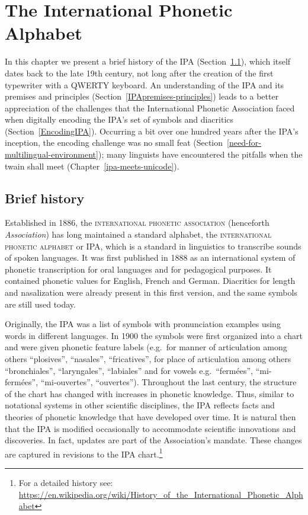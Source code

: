 \chapter{The International Phonetic Alphabet}
\label{the-international-phonetic-alphabet}

In this chapter we present a brief history of the IPA 
(Section~\ref{IPAhistory}), which itself dates 
back to the late 19th century, not long after the creation of the first 
typewriter with a QWERTY 
keyboard. An understanding of the IPA and its premises and principles 
(Section~\ref{IPApremises-principles}) leads to a better 
appreciation of the challenges that the International Phonetic Association 
faced when digitally encoding the IPA's set of symbols and 
diacritics (Section~\ref{EncodingIPA}). Occurring a bit over one hundred 
years after the IPA's inception, the encoding challenge was no small feat 
(Section~\ref{need-for-multilingual-environment}); many 
linguists have encountered the pitfalls when the twain shall meet 
(Chapter~\ref{ipa-meets-unicode}).

\section{Brief history}
\label{IPAhistory}

Established in 1886, the \textsc{international phonetic association} (henceforth
\textit{Association}) has long maintained a standard alphabet, the
\textsc{international phonetic alphabet} or IPA, which is a
standard in linguistics to transcribe sounds of spoken languages. It was
first published in 1888 as an international system of phonetic transcription for
oral languages and for pedagogical purposes. It contained phonetic values for
English, French and German. Diacritics for length and nasalization were already
present in this first version, and the same symbols are still used today. 

Originally, the IPA was a list of symbols with pronunciation examples
using words in different languages. In 1900 the symbols were first organized into
a chart and were given phonetic feature labels (e.g.\ for manner of
articulation among others ``plosives'', ``nasales'', ``fricatives'', for place of
articulation among others ``bronchiales'', ``laryngales'', ``labiales'' and for vowels
e.g.\ ``fermées'', ``mi-fermées'', ``mi-ouvertes'', ``ouvertes''). Throughout the last
century, the structure of the chart has changed with increases in phonetic
knowledge. Thus, similar to notational systems in other scientific disciplines,
the IPA reflects facts and theories of phonetic knowledge that have developed
over time. It is natural then that the IPA is modified occasionally to
accommodate scientific innovations and discoveries. In fact, updates are part of the
Association's mandate. These changes are captured in revisions to the IPA chart.\footnote{For a detailed history see:
\url{https://en.wikipedia.org/wiki/History\_of\_the\_International\_Phonetic_Alphabet}}

